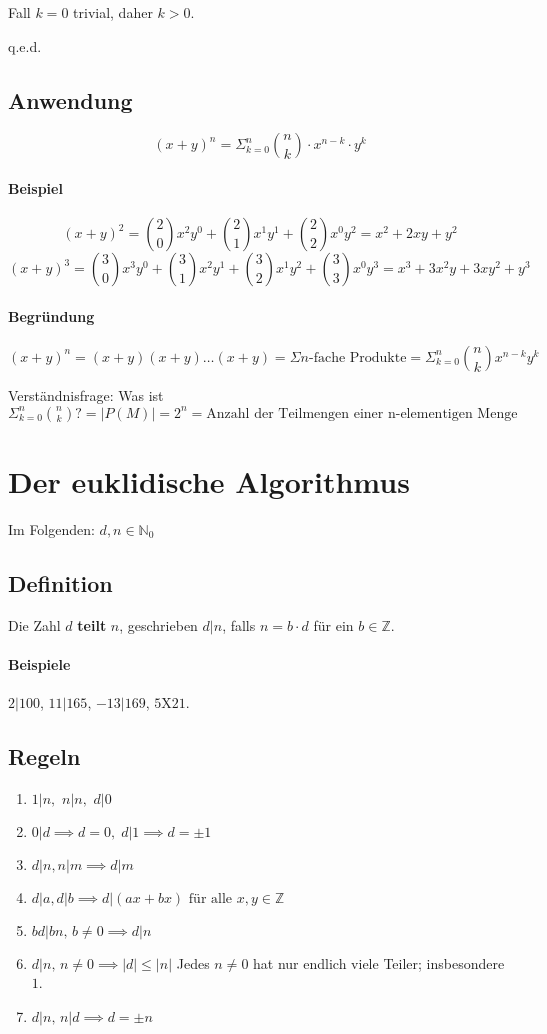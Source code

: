 \documentclass[14pt,a4paper]{article}
\begin{document}
				Fall $k = 0$ trivial, daher $k > 0$.

				q.e.d.
		\subsection{Anwendung}
			$$ ( x + y) ^n = \Sigma_{k=0}^n \binom{n}{k} \cdot x^{n-k} \cdot y^k $$

			\paragraph{Beispiel}
				$$ (x + y)^2 = \binom{2}{0} x^2 y^0 + \binom{2}{1} x^1 y^1 + \binom{2}{2} x^0 y^2 = x^2 + 2xy + y^2 $$
				$$ (x + y)^3 = \binom{3}{0} x^3 y^0 + \binom{3}{1} x^2 y^1 + \binom{3}{2} x^1 y^2 + \binom{3}{3} x^0 y^3 = x^3 + 3x^2y+3xy^2+y^3 $$

			\paragraph{Begründung}
				$$ (x+y)^n = (x+y)(x+y)\dots(x+y) = \Sigma n\text{-fache Produkte} = \Sigma_{k=0}^n \binom{n}{k} x^{n-k}y^k $$

			Verständnisfrage: Was ist $ \Sigma_{k=0}^n \binom{n}{k} \text{?} = |P(M)| = 2^n =  \text{Anzahl der Teilmengen einer n-elementigen Menge} $

	\section{Der euklidische Algorithmus}
		Im Folgenden: $ d,n \in \mathbb{N}_0 $
		\subsection{Definition}
			Die Zahl $d$ \textbf{teilt} $n$, geschrieben $d|n$, falls $n = b \cdot d$ für ein $b \in \mathbb{Z}$.
		\paragraph{Beispiele}
			$ 2 | 100 $, $ 11|165$, $-13|169$, $5 \text{X}21$.
		\subsection{Regeln}
			\begin{enumerate}
				\item $1|n,\,\,n|n,\,\,d|0$
				\item $0|d \implies d=0,\;d|1 \implies d = \pm 1$
				\item $d|n, n|m \implies d|m$
				\item $d|a, d|b \implies d|(ax + bx) \text{ für alle } x,y \in \mathbb{Z}$
				\item $bd | bn,\, b \neq 0 \implies d|n$
				\item $d|n, \, n \neq 0 \implies |d| \leq |n|$\,\,Jedes $n \neq 0$ hat nur endlich viele Teiler; insbesondere $1$.
				\item $d|n,\,n|d \implies d = \pm n$
			\end{enumerate}
\end{document}
